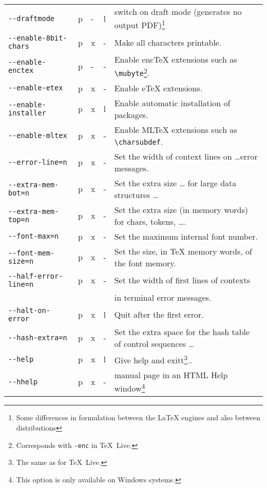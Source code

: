\documentclass[a4paper, english]{article}%
\newcommand{\texlive}{\TeX~Live}
\begin{document}
{\begin{longtable}{|lllll|}
\texttt{-{}-draftmode}                & p&-&l  & switch on draft mode (generates no output PDF)\footnote%
{Some differences in formulation between the \LaTeX{} engines and also between distributions} \\
\texttt{-{}-enable-8bit-chars}        & p&x&- & Make all characters printable. \\
\texttt{-{}-enable-enctex}            & p&-&- & Enable encTeX extensions such as \texttt{\textbackslash{}mubyte}\footnote%
{Corresponds with \texttt{-enc} in \texlive. }. \\
\texttt{-{}-enable-etex}              & p&x&- & Enable eTeX extensions. \\
\texttt{-{}-enable-installer}        & p&x&l       & Enable automatic installation of packages. \\
\texttt{-{}-enable-mltex}             & p&x&- & Enable MLTeX extensions such as \texttt{\textbackslash{}charsubdef}. \\
\texttt{-{}-error-line=n}             & p&x&- & Set the width of context lines on \dots error messages. \\
\texttt{-{}-extra-mem-bot=n}          & p&x&- & Set the extra size \dots{} for large data structures \dots \\
\texttt{-{}-extra-mem-top=n}          & p&x&- & Set the extra size (in memory words) for chars, tokens, \dots. \\
\texttt{-{}-font-max=n}               & p&x&- & Set the maximum internal font number. \\
\texttt{-{}-font-mem-size=n}          & p&x&- & Set the size, in TeX memory words, of the font memory. \\
\texttt{-{}-half-error-line=n}        & p&x&- & Set the width of first lines of contexts \\
                                      &  & &        & in terminal error messages. \\
\texttt{-{}-halt-on-error}            & p&x&l       & Quit after the first error. \\
\texttt{-{}-hash-extra=n}             & p&x&- & Set the extra space for the hash table of control sequences \dots \\
\texttt{-{}-help}                     & p&x&l       & Give help and exitt\footnote%
{The same as for \texlive. }.. \\
\texttt{-{}-hhelp}                   & p&x&- & manual page in an HTML Help window\footnote%
{This option is only available on Windows systems.} \\

\end{longtable}}
\end{document}
